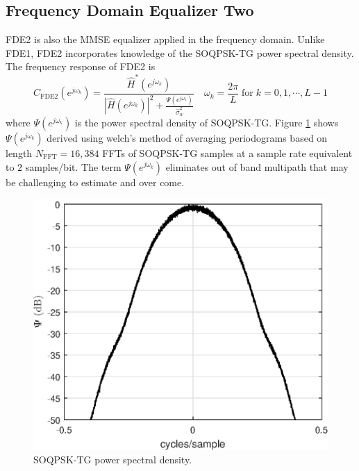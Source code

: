 \subsection{Frequency Domain Equalizer Two}
FDE2 is also the MMSE equalizer applied in the frequency domain.
Unlike FDE1, FDE2 incorporates knowledge of the SOQPSK-TG power spectral density.
The frequency response of FDE2 is \cite[eq. (12)]{williams2013linear}
\begin{equation}
C_\text{FDE2}(e^{j\omega_k}) = \frac{\hat{H}^\ast(e^{j\omega_k})}  {|\hat{H}(e^{j\omega_k})|^2  +  \frac{\Psi(e^{j\omega_k})}{\hat{\sigma}^2_w}} \quad
\omega_k = \frac{2\pi}{L} \;
\text{for} \;
k=0,1,\cdots,L-1
\label{eq:FDE2}
\end{equation}
where $\Psi(e^{j\omega_k})$ is the power spectral density of SOQPSK-TG.
Figure \ref{fig:SOQPSK_spectrum} shows $\Psi(e^{j\omega_k})$ derived using welch's method of averaging periodograms based on length $N_\text{FFT} = 16{,}384$ FFTs of SOQPSK-TG samples at a sample rate equivalent to $2$ samples/bit.
The term $\Psi(e^{j\omega_k})$ eliminates out of band multipath that may be challenging to estimate and over come.
\begin{figure}
	\centering\includegraphics[width=5in]{figures/eq_equations/FDE2_spectrum_PSI.eps}
	\caption{SOQPSK-TG power spectral density.}
	\label{fig:SOQPSK_spectrum}
\end{figure}


